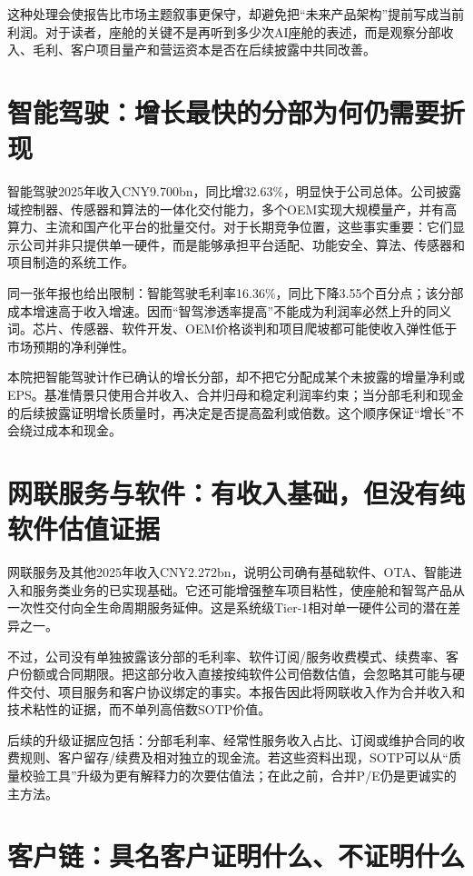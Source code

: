 这种处理会使报告比市场主题叙事更保守，却避免把“未来产品架构”提前写成当前利润。对于读者，座舱的关键不是再听到多少次AI座舱的表述，而是观察分部收入、毛利、客户项目量产和营运资本是否在后续披露中共同改善。

\section{智能驾驶：增长最快的分部为何仍需要折现}

智能驾驶2025年收入CNY9.700bn，同比增32.63\%，明显快于公司总体。公司披露域控制器、传感器和算法的一体化交付能力，多个OEM实现大规模量产，并有高算力、主流和国产化平台的批量交付。对于长期竞争位置，这些事实重要：它们显示公司并非只提供单一硬件，而是能够承担平台适配、功能安全、算法、传感器和项目制造的系统工作。

同一张年报也给出限制：智能驾驶毛利率16.36\%，同比下降3.55个百分点；该分部成本增速高于收入增速。因而“智驾渗透率提高”不能成为利润率必然上升的同义词。芯片、传感器、软件开发、OEM价格谈判和项目爬坡都可能使收入弹性低于市场预期的净利弹性。

本院把智能驾驶计作已确认的增长分部，却不把它分配成某个未披露的增量净利或EPS。基准情景只使用合并收入、合并归母和稳定利润率约束；当分部毛利和现金的后续披露证明增长质量时，再决定是否提高盈利或倍数。这个顺序保证“增长”不会绕过成本和现金。

\section{网联服务与软件：有收入基础，但没有纯软件估值证据}

网联服务及其他2025年收入CNY2.272bn，说明公司确有基础软件、OTA、智能进入和服务类业务的已实现基础。它还可能增强整车项目粘性，使座舱和智驾产品从一次性交付向全生命周期服务延伸。这是系统级Tier-1相对单一硬件公司的潜在差异之一。

不过，公司没有单独披露该分部的毛利率、软件订阅/服务收费模式、续费率、客户份额或合同期限。把这部分收入直接按纯软件公司倍数估值，会忽略其可能与硬件交付、项目服务和客户协议绑定的事实。本报告因此将网联收入作为合并收入和技术粘性的证据，而不单列高倍数SOTP价值。

后续的升级证据应包括：分部毛利率、经常性服务收入占比、订阅或维护合同的收费规则、客户留存/续费及相对独立的现金流。若这些资料出现，SOTP可以从“质量校验工具”升级为更有解释力的次要估值法；在此之前，合并P/E仍是更诚实的主方法。

\section{客户链：具名客户证明什么、不证明什么}

